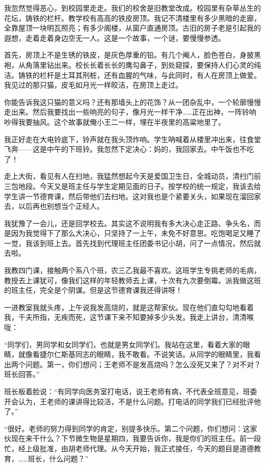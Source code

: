  我忽然觉得恶心，到校园里走走。我们的校舍是旧教堂改成。校园里有杂草丛生的花坛，铸铁的栏杆。教学校有高高的铁皮房顶。我记不清楼里有多少黑暗的走廊，全靠屋顶一块明瓦照亮；有多少阁楼，从窗户直通房顶。古旧的房子老是引起我的遐想，走着走着身边空无一人。这是一个故事，一个谜，要慢慢参透。 
 
 首先，房顶上不是生锈的铁皮，是灰色厚重的铅。有几个阉人，脸色苍白，身披黑袍，从角落里钻出来。校长长着长长的鹰勾鼻子，到处窥探，要保持人们心灵的纯洁。铸铁的栏杆是土耳其刑桩，还有血腥的气味，与此同时，有人在房顶上做爱。我见过的那只猫，皮毛如月光一样皎洁，在房顶上走过。 
 
 你能告诉我这只猫的意义吗？还有那墙头上的花饰？从一团杂乱中，一个轮廓慢慢走出来。然后我要找出一些响亮的句子，像月光一样干净……正在出神，一阵铃响吵得我要抽风。这个故事就俺小王二一样，埋在半夜里的高粱地里了。 
 
 我正好走在大电铃底下，铃声就在我头顶炸响。学生呐喊着从楼里冲出来，往食堂飞奔——这是中午的下班铃。我忽然下定决心：妈的，我回家去。中午饭也不吃了！ 
 
 走上大街，看见有人在扫地，我猛然想起今天是爱国卫生日，全城动员，清扫门前三包地段。今天又是班主任与学生定期见面的日子。按学校的统一规定，我该去给学生讲一节德育课，然后带他们去扫地。这对我也是个紧要关头，如果现在溜回家去，以后再也别想当个正经人。 
 
 我犹豫了一会儿，还是回学校去。其实这不说明我有多大决心走正路、争头名，而是因为我觉得下了那么大决心，只坚持了一上午，未免不好意思。吃饱喝足又睡了一觉，我该到班上去。首先找到代理班主任团委书记小胡，问了一点情况，然后就去啦。 
 
 我教四门课，接触两个系八个班，农三乙我最不喜欢。这班学生专挑老师的毛病，教授去上课犹可，像我们这样的年轻教师去上课，十次有九次要倒霉。派我做这班的班主任，完全是个阴谋。但是这节德育课我还得讲呀！ 
 
 一进教室我就头疼，上午说我发高烧的，就是这帮家伙。现在他们直勾勾地看着我，千夫所指，无疾而死，这节课下来不知要掉多少头发。我走上讲台，清清喉咙： 
 
 “同学们，男同学和女同学们，也就是男女同学们。我站在这里，看着大家的眼睛，就像看捷尔仁斯基同志的眼睛，我不敢看。不说笑话。从同学的眼睛里，我看出两个问题。第一，你们想问；王老师不是发高烧吗？怎么没死又来了？对不对？班长回答。” 
 
 班长板着脸说：“有同学向医务室打电话，说王老师有病，不代表全班意见，班委开会认为，王老师的课讲得比较活，不是什么问题。打电话的同学我们已经批评他了。” 
 
 “很好。老师的努力得到同学的肯定，别提多快乐。第二个问题，你们想问：这家伙现在来干什么？下节微生物是星期四，我要告诉你，我是你们的班主任。前一段忙，经上级批准，由胡老师代理。从今天开始，我正式接任，今天的题目是道德教育，……班长，什么问题？” 
 
